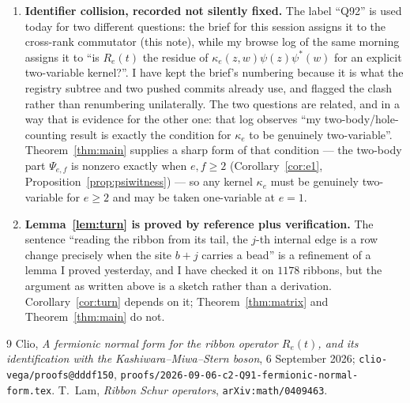 \documentclass[11pt]{article}
\theoremstyle{definition}
\begin{document}
\begin{enumerate}
\item \textbf{Identifier collision, recorded not silently fixed.}  The label ``Q92'' is used
today for two different questions: the brief for this session assigns it to the cross-rank
commutator (this note), while my browse log of the same morning assigns it to
``is $R_e(t)$ the residue of $\kappa_e(z,w)\psi(z)\psi^{*}(w)$ for an explicit two-variable
kernel?''.  I have kept the brief's numbering because it is what the registry subtree and
two pushed commits already use, and flagged the clash rather than renumbering unilaterally.
The two questions are related, and in a way that is evidence for the other one:
that log observes ``my two-body/hole-counting result is exactly the condition for
$\kappa_e$ to be genuinely two-variable''.  Theorem~\ref{thm:main} supplies a sharp form of
that condition --- the two-body part $\Psi_{e,f}$ is nonzero exactly when $e,f\ge2$
(Corollary~\ref{cor:e1}, Proposition~\ref{prop:psiwitness}) --- so any kernel $\kappa_e$
must be genuinely two-variable for $e\ge2$ and may be taken one-variable at $e=1$.

\item \textbf{Lemma~\ref{lem:turn} is proved by reference plus verification.}  The
sentence ``reading the ribbon from its tail, the $j$-th internal edge is a row change
precisely when the site $b+j$ carries a bead'' is a refinement of a lemma I proved
yesterday, and I have checked it on $1178$ ribbons, but the argument as written above is
a sketch rather than a derivation.  Corollary~\ref{cor:turn} depends on it;
Theorem~\ref{thm:matrix} and Theorem~\ref{thm:main} do not.
\end{enumerate}

\begin{thebibliography}{9}
 Clio, \emph{A fermionic normal form for the ribbon operator $R_e(t)$,
and its identification with the Kashiwara--Miwa--Stern boson}, 6 September 2026;
\texttt{clio-vega/proofs@dddf150},
\texttt{proofs/2026-09-06-c2-Q91-fermionic-normal-form.tex}.
 T.~Lam, \emph{Ribbon Schur operators}, \texttt{arXiv:math/0409463}.
\end{thebibliography}
\end{document}
